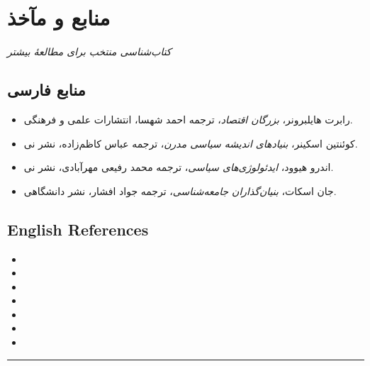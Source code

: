 \chapter*{منابع و مآخذ}

\begin{flushright}
\textit{کتاب‌شناسی منتخب برای مطالعهٔ بیشتر}
\end{flushright}

\vspace{10pt}

\section*{منابع فارسی}

\begin{itemize}[label=--]
    \item رابرت هایلبرونر، \textit{بزرگان اقتصاد}، ترجمه احمد شهسا، انتشارات علمی و فرهنگی.
    \item کوئنتین اسکینر، \textit{بنیادهای اندیشه سیاسی مدرن}، ترجمه عباس کاظم‌زاده، نشر نی.
    \item اندرو هیوود، \textit{ایدئولوژی‌های سیاسی}، ترجمه محمد رفیعی مهرآبادی، نشر نی.
    \item جان اسکات، \textit{بنیان‌گذاران جامعه‌شناسی}، ترجمه جواد افشار، نشر دانشگاهی.
\end{itemize}

\vspace{15pt}

\section*{English References}

\begin{itemize}[label=--]
    \item {}
    \item {}
    \item {}
    \item {}
    \item {}
    \item {}
    \item {}
\end{itemize}

\vspace{20pt}

\begin{center}
\rule{0.4\textwidth}{0.5pt}
\end{center}
